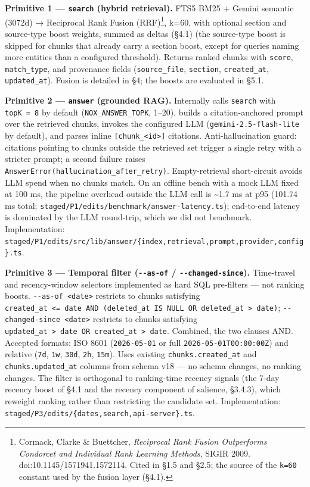 \documentclass[
]{article}
\begin{document}
\textbf{Primitive 1 --- \texttt{search} (hybrid retrieval).} FTS5 BM25 +
Gemini semantic (3072d) → Reciprocal Rank Fusion (RRF)\footnote{Cormack,
  Clarke \& Buettcher, \emph{Reciprocal Rank Fusion Outperforms
  Condorcet and Individual Rank Learning Methods}, SIGIR 2009.
  doi:10.1145/1571941.1572114. Cited in §1.5 and §2.5; the source of the
  \texttt{k=60} constant used by the fusion layer (§4.1).}, k=60, with
optional section and source-type boost weights, summed as deltas (§4.1)
(the source-type boost is skipped for chunks that already carry a
section boost, except for queries naming more entities than a configured
threshold). Returns ranked chunks with \texttt{score},
\texttt{match\_type}, and provenance fields (\texttt{source\_file},
\texttt{section}, \texttt{created\_at}, \texttt{updated\_at}). Fusion is
detailed in §4; the boosts are evaluated in §5.1.

\textbf{Primitive 2 --- \texttt{answer} (grounded RAG).} Internally
calls \texttt{search} with \texttt{topK\ =\ 8} by default
(\texttt{NOX\_ANSWER\_TOPK}, 1--20), builds a citation-anchored prompt
over the retrieved chunks, invokes the configured LLM
(\texttt{gemini-2.5-flash-lite} by default), and parses inline
\texttt{{[}chunk\_\textless{}id\textgreater{}{]}} citations.
Anti-hallucination guard: citations pointing to chunks outside the
retrieved set trigger a single retry with a stricter prompt; a second
failure raises
\texttt{AnswerError(\textquotesingle{}hallucination\_after\_retry\textquotesingle{})}.
Empty-retrieval short-circuit avoids LLM spend when no chunks match. On
an offline bench with a mock LLM fixed at 100 ms, the pipeline overhead
outside the LLM call is \textasciitilde1.7 ms at p95 (101.74 ms total;
\texttt{staged/P1/edits/benchmark/answer-latency.ts}); end-to-end
latency is dominated by the LLM round-trip, which we did not benchmark.
Implementation:
\texttt{staged/P1/edits/src/lib/answer/\{index,retrieval,prompt,provider,config\}.ts}.

\textbf{Primitive 3 --- Temporal filter (\texttt{-\/-as-of} /
\texttt{-\/-changed-since}).} Time-travel and recency-window selectors
implemented as hard SQL pre-filters --- not ranking boosts.
\texttt{-\/-as-of\ \textless{}date\textgreater{}} restricts to chunks
satisfying
\texttt{created\_at\ \textless{}=\ date\ AND\ (deleted\_at\ IS\ NULL\ OR\ deleted\_at\ \textgreater{}\ date)};
\texttt{-\/-changed-since\ \textless{}date\textgreater{}} restricts to
chunks satisfying
\texttt{updated\_at\ \textgreater{}\ date\ OR\ created\_at\ \textgreater{}\ date}.
Combined, the two clauses AND. Accepted formats: ISO 8601
(\texttt{2026-05-01} or full \texttt{2026-05-01T00:00:00Z}) and relative
(\texttt{7d}, \texttt{1w}, \texttt{30d}, \texttt{2h}, \texttt{15m}).
Uses existing \texttt{chunks.created\_at} and
\texttt{chunks.updated\_at} columns from schema v18 --- no schema
changes, no ranking changes. The filter is orthogonal to ranking-time
recency signals (the 7-day recency boost of §4.1 and the recency
component of salience, §3.4.3), which reweight ranking rather than
restricting the candidate set. Implementation:
\texttt{staged/P3/edits/\{dates,search,api-server\}.ts}.
\end{document}
